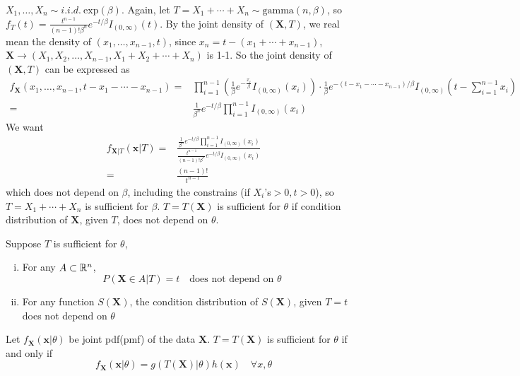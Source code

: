 \documentclass[english, 11pt]{article}
\begin{document}
\begin{exmp}\label{exmp:26}
$X_1, \dots, X_n\sim i.i.d.~ \text{exp}(\beta)$. Again, let $T=X_1+\cdots+X_n\sim \text{gamma}(n, \beta)$, so $f_T(t)=\frac{t^{n-1}}{(n-1)!\beta^n}e^{-t/\beta}I_{(0, \infty)}(t)$. By the joint density of $(\bm{X}, T)$, we real mean the density of $(x_1, \dots, x_{n-1}, t)$, since $x_n=t-(x_1+\cdots+x_{n-1})$, $\bm{X}\rightarrow(X_1, X_2, \dots, X_{n-1}, X_1+X_2+\cdots+X_n)$ is 1-1. So the joint density of $(\bm{X}, T)$ can be expressed as 
$$
\begin{aligned}
f_{\bm{X}}(x_1, \dots, x_{n-1}, t-x_1-\cdots-x_{n-1})=&\prod_{i=1}^{n-1}\left(\frac{1}{\beta}e^{-\frac{x_i}{\beta}}I_{(0, \infty)}(x_i)\right)\cdot\frac{1}{\beta}e^{-(t-x_1-\cdots-x_{n-1})/\beta}I_{(0, \infty)}\left(t-\sum_{i=1}^{n-1}x_i\right)\\
=&\frac{1}{\beta^n}e^{-t/\beta}\prod_{i=1}^{n-1}I_{(0, \infty)}(x_i)
\end{aligned}
$$
We want 
$$
\begin{aligned}
f_{\bm{X}|T}(\bm{x}|T)=&\frac{\frac{1}{\beta^n}e^{-t/\beta}\prod_{i=1}^{n-1}I_{(0, \infty)}(x_i)}{\frac{t^{n-1}}{(n-1)!\beta^n}e^{-t/\beta}I_{(0, \infty)}(x_i)}\\
=&\frac{(n-1)!}{t^{n-1}}
\end{aligned}
$$
which does not depend on $\beta$, including the constrains (if $X_i$'s$>0, t>0$), so $T=X_1+\cdots+X_n$ is sufficient for $\beta$. $T=T(\bm{X})$ is sufficient for $\theta$ if condition distribution of $\bm{X}$, given $T$, does not depend on $\theta$.
\end{exmp}


\begin{cor}\label{cor:2.7}
Suppose $T$ is sufficient for $\theta$, 
\begin{enumerate}[i).]
\item For any $A\subset{\mathbb{R}}^n$, 
$$
P(\bm{X}\in A|T)=t\quad\text{does not depend on $\theta$}
$$
\item For any function $S(\bm{X})$, the condition distribution of $S(\bm{X})$, given $T=t$ does not depend on $\theta$
\end{enumerate}
\end{cor}

\begin{thrm}\label{thrm:factorization}
Let $f_{\bm{X}}(\bm{x}|\theta)$ be joint pdf(pmf) of the data $\bm{X}$. $T=T(\bm{X})$ is sufficient for $\theta$ if and only if 
$$
f_{\bm{X}}(\bm{x}|\theta)=g(T(\bm{X})|\theta)h(\bm{x})\quad \forall x, \theta
$$
\end{thrm}
\end{document}
